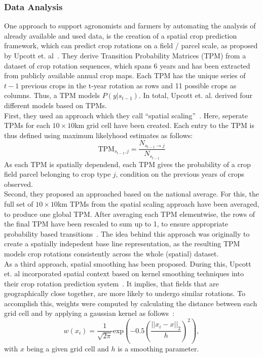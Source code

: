 \documentclass{Academic}
\begin{document}
    \subsubsection{Data Analysis} %
    One approach to support agronomists and farmers by automating the analysis of already available and used data, is the creation of a spatial crop prediction framework, which can predict crop rotations on a field / parcel scale, as proposed by Upcott et. al~\cite{upcott_new_2023}. They derive Transition Probability Matrices (TPM) from a dataset of crop rotation sequences, which spans 6 years and has been extracted from publicly available annual crop maps. Each TPM has the unique series of $t-1$ previous crops in the t-year rotation as rows and 11 possible crops as columns. Thus, a TPM models $P(y|s_{t-1})$. In total, Upcott et. al. derived four different models based on TPMs.\\
    First, they used an approach which they call \enquote{spatial scaling}~\cite{upcott_new_2023}. Here, seperate TPMs for each $10\times 10$km grid cell have been created. Each entry to the TPM is thus defined using maximum likelyhood estimates as follows:
    $$\mathrm{TPM}_{s_{t-1},j} = \frac{N_{s_{t-1} \rightarrow j}}{N_{s_{t-1}}}$$
    As each TPM is spatially dependend, each TPM gives the probability of a crop field parcel belonging to crop type $j$, condition on the previous years of crops observed. \\
    Second, they proposed an approached based on the national average. For this, the full set of $10\times 10$km TPMs from the spatial scaling approach have been averaged, to produce one global TPM. After averaging each TPM elementwise, the rows of the final TPM have been rescaled to sum up to 1, to ensure appropriate probability based transitions~\cite{upcott_new_2023}. The idea behind this approach was originally to create a spatially indepedent base line representation, as the resulting TPM models crop rotations consistently across the whole (spatial) dataset. \\
    As a third approach, spatial smoothing has been proposed. During this, Upcott et. al incorporated spatial context based on kernel smoothing techniques into their crop rotation prediction system~\cite{upcott_new_2023}. It implies, that fields that are geographically close together, are more likely to undergo similar rotations. To accomplish this, weights were computed by calculating the distance between each grid cell and by applying a gaussian kernel as follows~\cite{upcott_new_2023}:
    \[w(x_i) = \frac{1}{\sqrt{2\pi}}\mathrm{exp}(-0.5(\frac{||x_i - x||_2}{h})^2),\]
    with $x$ being a given grid cell and $h$ is a smoothing parameter.
\end{document}
